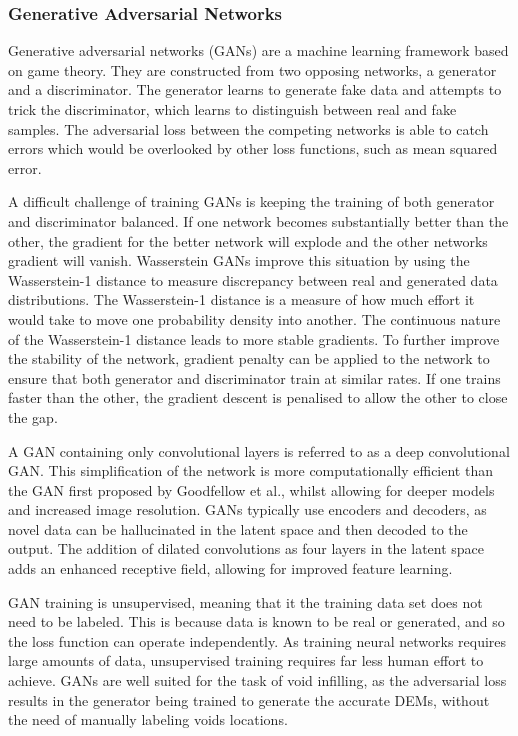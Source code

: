 \documentclass[twocolumn]{article}
\begin{document}
\subsubsection{Generative Adversarial Networks}
\label{sec:org311f4f3}
Generative adversarial networks (GANs)\autocite{goodfellowGenerativeAdversarialNetworks2020} are a machine learning framework based on game theory.
They are constructed from two opposing networks, a generator and a discriminator.
The generator learns to generate fake data and attempts to trick the discriminator, which learns to distinguish between real and fake samples.
The adversarial loss between the competing networks is able to catch errors which would be overlooked by other loss functions, such as mean squared error\autocite{lotterUnsupervisedLearningVisual2016}.

A difficult challenge of training GANs is keeping the training of both generator and discriminator balanced.
If one network becomes substantially better than the other, the gradient for the better network will explode and the other networks gradient will vanish.
Wasserstein GANs\autocite{arjovskyWassersteinGenerativeAdversarial2017} improve this situation by using the Wasserstein-1 distance to measure discrepancy between real and generated data distributions.
The Wasserstein-1 distance is a measure of how much effort it would take to move one probability density into another.
The continuous nature of the Wasserstein-1 distance leads to more stable gradients.
To further improve the stability of the network, gradient penalty can be applied to the network to ensure that both generator and discriminator train at similar rates.
If one trains faster than the other, the gradient descent is penalised to allow the other to close the gap.

A GAN containing only convolutional layers is referred to as a deep convolutional GAN\autocite{radfordUnsupervisedRepresentationLearning2016}.
This simplification of the network is more computationally efficient than the GAN first proposed by Goodfellow et al.\autocite{goodfellowGenerativeAdversarialNetworks2020}, whilst allowing for deeper models and increased image resolution.
GANs typically use encoders and decoders, as novel data can be hallucinated in the latent space and then decoded to the output.
The addition of dilated convolutions\autocite{yuMultiScaleContextAggregation2016} as four layers in the latent space adds an enhanced receptive field, allowing for improved feature learning.

GAN training is unsupervised, meaning that it the training data set does not need to be labeled.
This is because data is known to be real or generated, and so the loss function can operate independently.
As training neural networks requires large amounts of data, unsupervised training requires far less human effort to achieve.
GANs are well suited for the task of void infilling, as the adversarial loss results in the generator being trained to generate the accurate DEMs, without the need of manually labeling voids locations.
\end{document}
